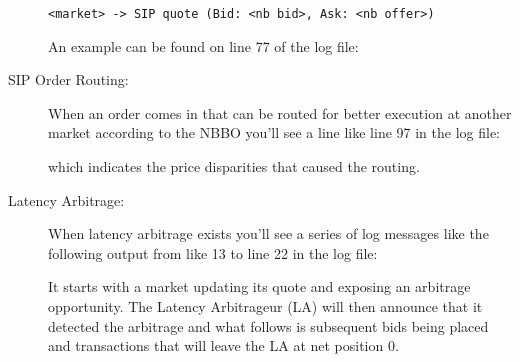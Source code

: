 \documentclass[11pt]{article}
\newcommand{\logfile}{simulations_1_14-Oct-2013_15.56.06.txt}
\begin{document}
\begin{description}
\begin{verbatim}
<market> -> SIP quote (Bid: <nb bid>, Ask: <nb offer>)
\end{verbatim}

An example can be found on line 77 of the log file:



\item[SIP Order Routing:] When an order comes in that can be routed for better
  execution at another market according to the NBBO you'll see a line like line
  97 in the log file:

  

  which indicates the price disparities that caused the routing.

\item[Latency Arbitrage:] When latency arbitrage exists you'll see a series of
  log messages like the following output from like 13 to line 22 in the log file:

  

  It starts with a market updating its quote and exposing an arbitrage
  opportunity. The Latency Arbitrageur (LA) will then announce that it detected
  the arbitrage and what follows is subsequent bids being placed and
  transactions that will leave the LA at net position 0.

\end{description}
\end{document}
